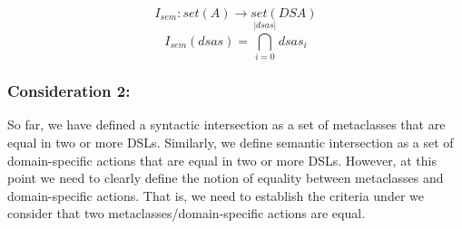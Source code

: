 \begin{equation}
  I_{sem} : set(A) \rightarrow set(DSA)
\end{equation}
\vspace{-2mm}
\begin{equation}
  I_{sem}(dsas) = \bigcap _{i=0}^{|dsas|}dsas_i
\end{equation}

\vspace{-2mm}
\subsubsection{Consideration 2:} So far, we have defined a syntactic intersection as a set of metaclasses that are equal in two or more DSLs. Similarly, we define semantic intersection as a set of domain-specific actions that are equal in two or more DSLs. However, at this point we need to clearly define the notion of equality between metaclasses and domain-specific actions. That is, we need to establish the criteria under we consider that two metaclasses/domain-specific actions are equal.

